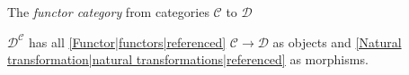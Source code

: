 
The \emph{functor category} from categories $\mathcal{C}$ to $\mathcal{D}$

$\mathcal{D}^\mathcal{C}$ has all \ref{Functor|functors|referenced} $\mathcal{C} \rightarrow \mathcal{D}$ as objects and \ref{Natural transformation|natural transformations|referenced} as morphisms.
